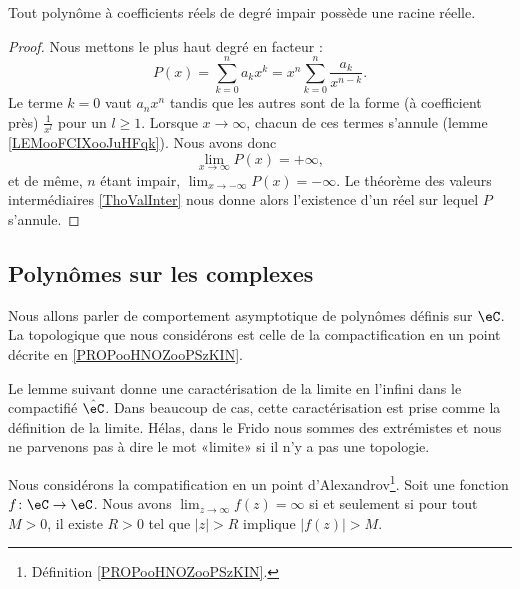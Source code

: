 \begin{proposition}     \label{PROPooJKYJooFqbQMr}
    Tout polynôme à coefficients réels de degré impair possède une racine réelle.
\end{proposition}

\begin{proof}
    Nous mettons le plus haut degré en facteur :
    \begin{equation}
        P(x)=\sum_{k=0}^na_kx^k=x^n\sum_{k=0}^n\frac{ a_k }{ x^{n-k} }.
    \end{equation}
    Le terme \( k=0\) vaut \( a_nx^n\) tandis que les autres sont de la forme (à coefficient près) \( \frac{1}{ x^l }\) pour un \( l\geq 1\). Lorsque \( x\to \infty\), chacun de ces termes s'annule (lemme \ref{LEMooFCIXooJuHFqk}). Nous avons donc
    \begin{equation}
        \lim_{x\to \infty} P(x)=+\infty,
    \end{equation}
    et de même, \( n\) étant impair, \( \lim_{x\to -\infty} P(x)=-\infty\). Le théorème des valeurs intermédiaires \ref{ThoValInter} nous donne alors l'existence d'un réel sur lequel \( P\) s'annule.
\end{proof}

\subsection{Polynômes sur les complexes}

Nous allons parler de comportement asymptotique de polynômes définis sur \( \eC\). La topologique que nous considérons est celle de la compactification en un point décrite en \ref{PROPooHNOZooPSzKIN}.

Le lemme suivant donne une caractérisation de la limite en l'infini dans le compactifié \( \hat \eC\). Dans beaucoup de cas, cette caractérisation est prise comme la définition de la limite. Hélas, dans le Frido nous sommes des extrémistes et nous ne parvenons pas à dire le mot «limite» si il n'y a pas une topologie.
\begin{lemma}        \label{LEMooERABooQjLBzW}
    Nous considérons la compatification en un point d'Alexandrov\footnote{Définition \ref{PROPooHNOZooPSzKIN}.}. Soit une fonction \( f\colon \eC\to \eC\). Nous avons \( \lim_{z\to \infty} f(z)=\infty\) si et seulement si pour tout \( M>0\), il existe \( R>0\) tel que \( | z |>R\) implique \( | f(z) |>M\).
\end{lemma}

